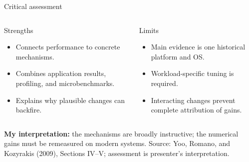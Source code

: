 \documentclass[aspectratio=169,11pt]{beamer}
\newcommand{\src}[1]{\vfill{\tiny\color{gray}Source: Yoo, Romano, and Kozyrakis (2009), #1.}}
\begin{document}
\begin{frame}{Critical assessment}
\begin{columns}[T]
\begin{block}{Strengths}
\begin{itemize}
\item Connects performance to concrete mechanisms.
\item Combines application results, profiling, and microbenchmarks.
\item Explains why plausible changes can backfire.
\end{itemize}
\end{block}
\begin{block}{Limits}
\begin{itemize}
\item Main evidence is one historical platform and OS.
\item Workload-specific tuning is required.
\item Interacting changes prevent complete attribution of gains.
\end{itemize}
\end{block}
\end{columns}
\vspace{.3cm}
\textbf{My interpretation:} the mechanisms are broadly instructive; the numerical gains must be remeasured on modern systems.
\src{Sections IV--V; assessment is presenter's interpretation}
\end{frame}
\end{document}
